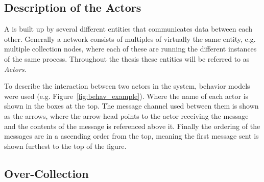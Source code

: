 

\subsection{Description of the Actors}


A \wsn is built up by several different entities that communicates data between each other. Generally a network consists of multiples of virtually the same entity, e.g. multiple collection nodes, where each of these are running the different instances of the same process. Throughout the thesis these entities will be referred to as \textit{Actors}.

To describe the interaction between two actors in the system, behavior models were used (e.g. Figure~\ref{fig:behav_example}). Where the name of each actor is shown in the boxes at the top. The message channel used between them is shown as the arrows, where the arrow-head points to the actor receiving the message and the contents of the message is referenced above it. Finally the ordering of the messages are in a ascending order from the top, meaning the first message sent is shown furthest to the top of the figure.



\subsection{Over-Collection}





